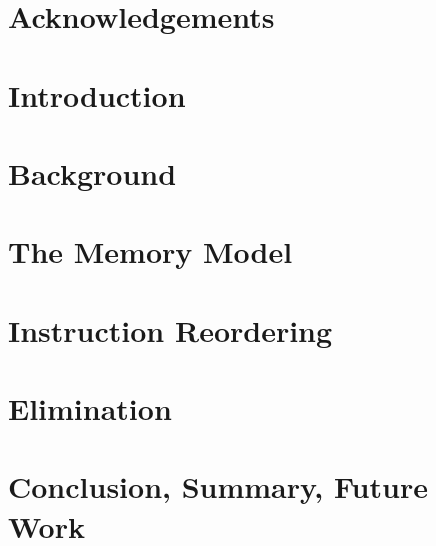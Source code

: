 \documentclass[12pt, TexShade, letterpaper]{report}
\begin{document}
\chapter*{Acknowledgements}
	\label{chap:acknowledgments}


 \tableofcontents\thispagestyle{plain}

 \listoffigures\thispagestyle{plain}
 \listoftables

  \clearpage

    \chapter{Introduction}
    

    \chapter{Background}
    

    \chapter{The Memory Model}
    

    \chapter{Instruction Reordering}
    

    \chapter{Elimination} 
    

    \chapter{Conclusion, Summary, Future Work}
    
    
    \printbibliography
\end{document}
